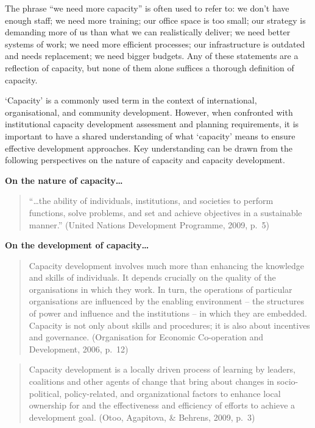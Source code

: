 \documentclass[
  10pt,
]{report}
\begin{document}
The phrase ``we need more capacity'' is often used to refer to: we don't
have enough staff; we need more training; our office space is too small;
our strategy is demanding more of us than what we can realistically
deliver; we need better systems of work; we need more efficient
processes; our infrastructure is outdated and needs replacement; we need
bigger budgets. Any of these statements are a reflection of capacity,
but none of them alone suffices a thorough definition of capacity.

`Capacity' is a commonly used term in the context of international,
organisational, and community development. However, when confronted with
institutional capacity development assessment and planning requirements,
it is important to have a shared understanding of what `capacity' means
to ensure effective development approaches. Key understanding can be
drawn from the following perspectives on the nature of capacity and
capacity development.

\textbf{On the nature of capacity\ldots{}}

\begin{quote}
``\ldots the ability of individuals, institutions, and societies to
perform functions, solve problems, and set and achieve objectives in a
sustainable manner.'' (United Nations Development Programme, 2009, p.~5)
\end{quote}

\textbf{On the development of capacity\ldots{}}

\begin{quote}
Capacity development involves much more than enhancing the knowledge and
skills of individuals. It depends crucially on the quality of the
organisations in which they work. In turn, the operations of particular
organisations are influenced by the enabling environment -- the
structures of power and influence and the institutions -- in which they
are embedded. Capacity is not only about skills and procedures; it is
also about incentives and governance. (Organisation for Economic
Co-operation and Development, 2006, p.~12)
\end{quote}

\begin{quote}
Capacity development is a locally driven process of learning by leaders,
coalitions and other agents of change that bring about changes in
socio-political, policy-related, and organizational factors to enhance
local ownership for and the effectiveness and efficiency of efforts to
achieve a development goal. (Otoo, Agapitova, \& Behrens, 2009, p.~3)
\end{quote}
\end{document}
